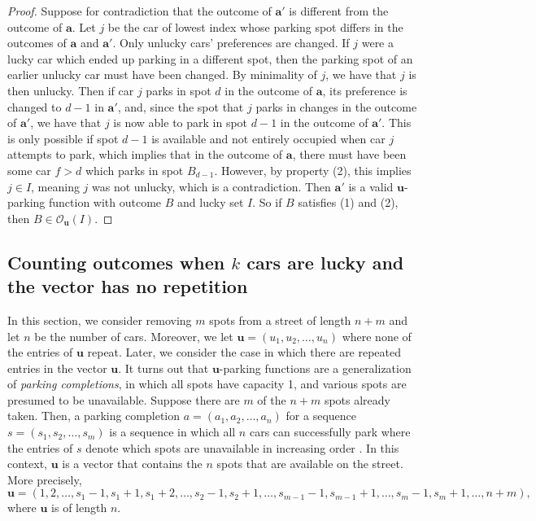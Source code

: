 \documentclass[reqno]{amsart}
\theoremstyle{definition}
\theoremstyle{remark}
\newcommand{\out}{\mathcal{O}}
\newcommand{\bsy}{\boldsymbol}
\begin{document}
\begin{proof}
Suppose for contradiction that the outcome of $\bsy{a}'$ is different from the outcome of $\bsy{a}$. Let $j$ be the car of lowest index whose parking spot differs in the outcomes of $\bsy a$ and $\bsy a'$. Only unlucky cars' preferences are changed.
If $j$ were a lucky car which ended up parking in a different spot, then the parking spot of an earlier unlucky car must have been changed. By minimality of $j$, we have that $j$ is then unlucky.   Then if car $j$ parks in spot $d$ in the outcome of $\bsy a$, its preference is changed to $d-1$ in $\bsy a'$, and, since the spot that $j$ parks in changes in the outcome of $\bsy a'$, we have that $j$ is now able to park in spot ${d-1}$ in the outcome of $\bsy a'$. 
This is only possible if spot ${d-1}$ is available and not entirely occupied when car $j$ attempts to park, which implies that in the outcome of $\bsy a$, there must have been some car $f>d$ which parks in spot $B_{d-1}$.
However, by property (2), this implies $j\in I$, meaning $j$ was not unlucky, which is a contradiction.
Then $\bsy a'$ is a valid $\bsy u$-parking function with outcome $B$ and lucky set $I$. So if $B$ satisfies (1) and (2), then $B \in \out_{\bsy u}(I)$.
\end{proof}



\subsection{Counting outcomes when $k$ cars are lucky and the vector has no repetition}\label{subsec: k cars lucky no rep}
In this section, we consider removing $m$ spots from a street of length $n+m$ and let $n$ be the number of cars. Moreover, we let $\bsy{u}=(u_1,u_2,\ldots, u_n)$ where none of the entries of $\bsy{u}$ repeat. Later, we consider the case in which there are repeated entries in the vector $\bsy{u}$. It turns out that $\bsy{u}$-parking functions are a generalization of \emph{parking completions}, in which all spots have capacity 1, and various spots are presumed to be unavailable. Suppose there are $m$ of the $n+m$ spots already taken. Then, a parking completion $a=(a_1,a_2,\ldots, a_n)$  for a sequence $s=(s_1,s_2,\ldots,s_m)$ is a sequence in which all $n$ cars can successfully park where the entries of $s$ denote which spots are unavailable in increasing order \cite{completions}. In this context, $\bsy{u}$ is a vector that contains the $n$ spots that are available on the street. More precisely, \[\bsy{u}=(1,2,\ldots, s_1-1, s_1+1, s_1+2, \ldots, s_2-1, s_2+1,\ldots, s_{m-1}-1,s_{m-1}+1,\ldots, s_m-1,s_m+1,\ldots, n+m),\] where $\bsy{u}$ is of length $n$.
\end{document}
